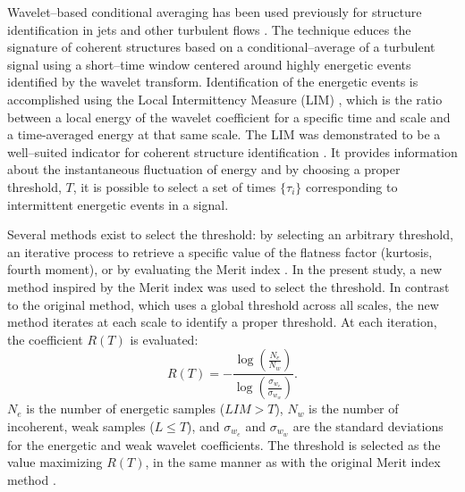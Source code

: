Wavelet--based conditional averaging has been used previously for structure identification in jets and other turbulent flows \citep{Camussi1997,Camussi1999,Guj1999,Camussi2002,Guj2003}.
The technique educes the signature of coherent structures based on a conditional--average of a turbulent signal using a short--time window centered around highly energetic events identified by the wavelet transform.
Identification of the energetic events is accomplished using the Local Intermittency Measure (LIM) \citep{Farge1992}, which is the ratio between a local energy of the wavelet coefficient for a specific time and scale and a time-averaged energy at that same scale.
The LIM was demonstrated to be a well--suited indicator for coherent structure identification \citep{Camussi1997}.
It provides information about the instantaneous fluctuation of energy and by choosing a proper threshold, $T$, it is possible to select a set of times $\{\tau_{i}\}$ corresponding to intermittent energetic events in a signal.

Several methods exist to select the threshold: by selecting an arbitrary threshold, an iterative process to retrieve a specific value of the flatness factor (kurtosis, fourth moment), or by evaluating the Merit index \citep{Grassucci2015}. 
In the present study, a new method inspired by the Merit index was used to select the threshold. 
In contrast to the original method, which uses a global threshold across all scales, the new method iterates at each scale to identify a proper threshold. 
At each iteration, the coefficient $R(T)$ is evaluated:
\begin{equation} \label{eqn:tEvaluation}
R(T) = -\frac{\log\left(\frac{N_e}{N_w}\right)}{\log\left(\frac{\sigma_{w_e}}{\sigma_{w_w}}\right)}.
\end{equation} 
$N_e$ is the number of energetic samples ($LIM > T$), $N_w$ is the number of incoherent, weak samples ($L \leqslant T$), and $\sigma_{w_e}$ and $\sigma_{w_w}$ are the standard deviations for the energetic and weak wavelet coefficients.
The threshold is selected as the value maximizing $R(T)$, in the same manner as with the original Merit index method \citep{Grassucci2015}.

